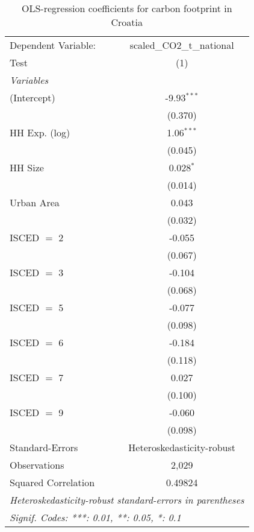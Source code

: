 
\begin{table}[htbp!]
   \centering
   \small
   \begin{adjustbox}{width = 1\textwidth, max height = 0.95\textheight, center}
      \begin{threeparttable}[b]
         \caption{\label{tab:OLS_2_HRV} OLS-regression coefficients for carbon footprint in Croatia}
         \begin{tabular}{lc}
            \tabularnewline \midrule \midrule
            Dependent Variable: & scaled\_CO2\_t\_national\\     
            Test                & (1)\\  
            \midrule
            \emph{Variables}\\
            (Intercept)         & -9.93$^{***}$\\   
                                & (0.370)\\   
            HH Exp. (log)       & 1.06$^{***}$\\   
                                & (0.045)\\   
            HH Size             & 0.028$^{*}$\\   
                                & (0.014)\\   
            Urban Area          & 0.043\\   
                                & (0.032)\\   
            ISCED $=$ 2         & -0.055\\   
                                & (0.067)\\   
            ISCED $=$ 3         & -0.104\\   
                                & (0.068)\\   
            ISCED $=$ 5         & -0.077\\   
                                & (0.098)\\   
            ISCED $=$ 6         & -0.184\\   
                                & (0.118)\\   
            ISCED $=$ 7         & 0.027\\   
                                & (0.100)\\   
            ISCED $=$ 9         & -0.060\\   
                                & (0.098)\\   
            \midrule 
            Standard-Errors     & Heteroskedasticity-robust \\   
            Observations        & 2,029\\  
            Squared Correlation & 0.49824\\  
            \midrule \midrule
            \multicolumn{2}{l}{\emph{Heteroskedasticity-robust standard-errors in parentheses}}\\
            \multicolumn{2}{l}{\emph{Signif. Codes: ***: 0.01, **: 0.05, *: 0.1}}\\
         \end{tabular}
         

\end{threeparttable}
\end{adjustbox}
\end{table}
